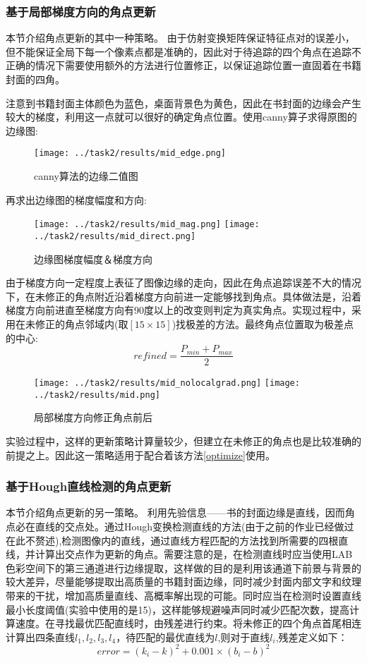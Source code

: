 \documentclass[UTF8]{ctexart}
\begin{document}
\subsubsection{基于局部梯度方向的角点更新}
本节介绍角点更新的其中一种策略。
由于仿射变换矩阵保证特征点对的误差小，但不能保证全局下每一个像素点都是准确的，因此对于待追踪的四个角点在追踪不正确的情况下需要使用额外的方法进行位置修正，以保证追踪位置一直固着在书籍封面的四角。

注意到书籍封面主体颜色为蓝色，桌面背景色为黄色，因此在书封面的边缘会产生较大的梯度，利用这一点就可以很好的确定角点位置。使用canny算子求得原图的边缘图:
\begin{figure}[H]
    \centering
    \texttt{[image: ../task2/results/mid\_edge.png]}
    \caption{canny算法的边缘二值图}
\end{figure}
再求出边缘图的梯度幅度和方向:
\begin{figure}[H]
    \centering
    \texttt{[image: ../task2/results/mid\_mag.png]}
    \texttt{[image: ../task2/results/mid\_direct.png]}
    \caption{边缘图梯度幅度＆梯度方向}
\end{figure}
由于梯度方向一定程度上表征了图像边缘的走向，因此在角点追踪误差不大的情况下，在未修正的角点附近沿着梯度方向前进一定能够找到角点。具体做法是，沿着梯度方向前进直至梯度方向有90度以上的改变则判定为真实角点。实现过程中，采用在未修正的角点邻域内(取$[15\times15]$)找极差的方法。最终角点位置取为极差点的中心:
\begin{equation}
    refined= \frac{P_{min}+P_{max}}{2}
\end{equation}
\begin{figure}[H]
    \centering
    \texttt{[image: ../task2/results/mid\_nolocalgrad.png]}
    \texttt{[image: ../task2/results/mid.png]}
    \caption{局部梯度方向修正角点前后}
\end{figure}
实验过程中，这样的更新策略计算量较少，但建立在未修正的角点也是比较准确的前提之上。因此这一策略适用于配合着该方法\ref{optimize}使用。

\subsubsection{基于Hough直线检测的角点更新}
本节介绍角点更新的另一策略。
利用先验信息——书的封面边缘是直线，因而角点必在直线的交点处。通过Hough变换检测直线的方法(由于之前的作业已经做过在此不赘述),检测图像内的直线，通过直线方程匹配的方法找到所需要的四根直线，并计算出交点作为更新的角点。需要注意的是，在检测直线时应当使用LAB色彩空间下的第三通道进行边缘提取，这样做的目的是利用该通道下前景与背景的较大差异，尽量能够提取出高质量的书籍封面边缘，同时减少封面内部文字和纹理带来的干扰，增加高质量直线、高概率解出现的可能。同时应当在检测时设置直线最小长度阈值(实验中使用的是15)，这样能够规避噪声同时减少匹配次数，提高计算速度。在寻找最优匹配直线时，由残差进行约束。将未修正的四个角点首尾相连计算出四条直线$l_1,l_2,l_3,l_4$，待匹配的最优直线为$l$,则对于直线$l_i$,残差定义如下：
\begin{equation}
    error = (k_i-k)^2+0.001\times(b_i-b)^2
\end{equation}
\end{document}

